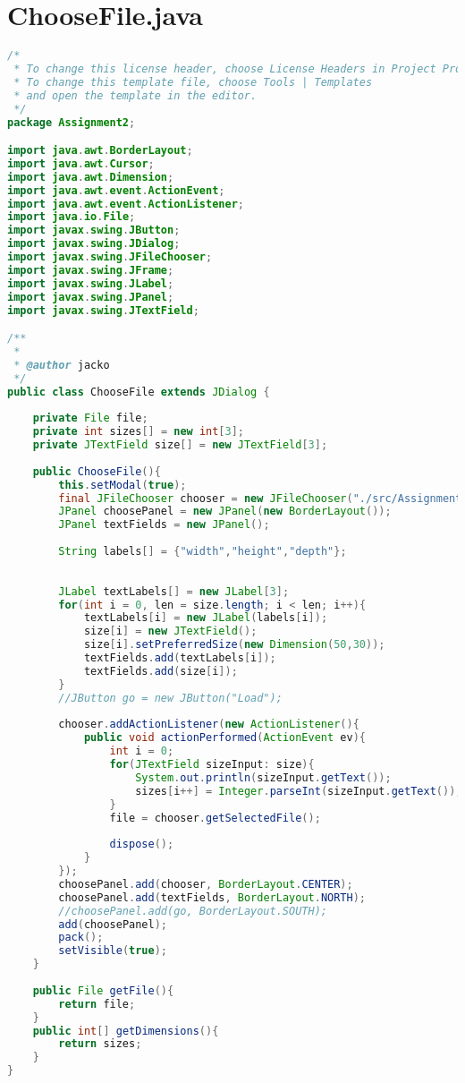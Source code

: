\documentclass[pdftex,a4paper,10pt,titlepage]{article}
\begin{document}
\section{ChooseFile.java}

\begin{lstlisting}[language=java, breaklines=true]
/*
 * To change this license header, choose License Headers in Project Properties.
 * To change this template file, choose Tools | Templates
 * and open the template in the editor.
 */
package Assignment2;

import java.awt.BorderLayout;
import java.awt.Cursor;
import java.awt.Dimension;
import java.awt.event.ActionEvent;
import java.awt.event.ActionListener;
import java.io.File;
import javax.swing.JButton;
import javax.swing.JDialog;
import javax.swing.JFileChooser;
import javax.swing.JFrame;
import javax.swing.JLabel;
import javax.swing.JPanel;
import javax.swing.JTextField;

/**
 *
 * @author jacko
 */
public class ChooseFile extends JDialog {
    
    private File file;
    private int sizes[] = new int[3];
    private JTextField size[] = new JTextField[3];
    
    public ChooseFile(){
        this.setModal(true);
        final JFileChooser chooser = new JFileChooser("./src/Assignment2");
        JPanel choosePanel = new JPanel(new BorderLayout());
        JPanel textFields = new JPanel();
        
        String labels[] = {"width","height","depth"};
        
        
        JLabel textLabels[] = new JLabel[3];
        for(int i = 0, len = size.length; i < len; i++){
            textLabels[i] = new JLabel(labels[i]);
            size[i] = new JTextField();
            size[i].setPreferredSize(new Dimension(50,30));
            textFields.add(textLabels[i]);
            textFields.add(size[i]);
        }
        //JButton go = new JButton("Load");
        
        chooser.addActionListener(new ActionListener(){
            public void actionPerformed(ActionEvent ev){
                int i = 0;
                for(JTextField sizeInput: size){
                    System.out.println(sizeInput.getText());
                    sizes[i++] = Integer.parseInt(sizeInput.getText());
                }
                file = chooser.getSelectedFile();
                
                dispose();
            }
        });
        choosePanel.add(chooser, BorderLayout.CENTER);
        choosePanel.add(textFields, BorderLayout.NORTH);
        //choosePanel.add(go, BorderLayout.SOUTH);
        add(choosePanel);
        pack();
        setVisible(true);
    }
    
    public File getFile(){
        return file;
    }
    public int[] getDimensions(){
        return sizes;
    }
}

\end{lstlisting}
\end{document}

